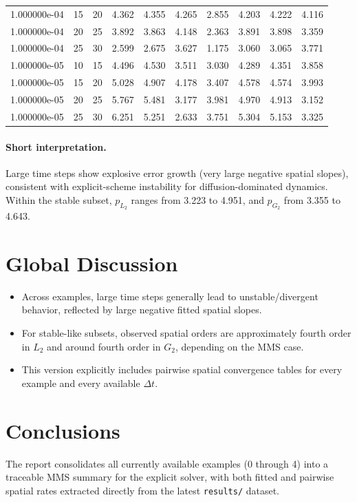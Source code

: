 \documentclass[11pt,a4paper]{article}
\begin{document}
\begin{table}[htbp]
{\begin{tabular}{cccccccccc}
1.000000e-04 & 15 & 20 & 4.362 & 4.355 & 4.265 & 2.855 & 4.203 & 4.222 & 4.116 \\
1.000000e-04 & 20 & 25 & 3.892 & 3.863 & 4.148 & 2.363 & 3.891 & 3.898 & 3.359 \\
1.000000e-04 & 25 & 30 & 2.599 & 2.675 & 3.627 & 1.175 & 3.060 & 3.065 & 3.771 \\
1.000000e-05 & 10 & 15 & 4.496 & 4.530 & 3.511 & 3.030 & 4.289 & 4.351 & 3.858 \\
1.000000e-05 & 15 & 20 & 5.028 & 4.907 & 4.178 & 3.407 & 4.578 & 4.574 & 3.993 \\
1.000000e-05 & 20 & 25 & 5.767 & 5.481 & 3.177 & 3.981 & 4.970 & 4.913 & 3.152 \\
1.000000e-05 & 25 & 30 & 6.251 & 5.251 & 2.633 & 3.751 & 5.304 & 5.153 & 3.325 \\
\bottomrule
\end{tabular}%
}
\end{table}
\paragraph{Short interpretation.}
Large time steps show explosive error growth (very large negative spatial slopes), consistent with explicit-scheme instability for diffusion-dominated dynamics. Within the stable subset, $p_{L_2}$ ranges from 3.223 to 4.951, and $p_{G_2}$ from 3.355 to 4.643.
\section{Global Discussion}
\begin{itemize}
\item Across examples, large time steps generally lead to unstable/divergent behavior, reflected by large negative fitted spatial slopes.
\item For stable-like subsets, observed spatial orders are approximately fourth order in $L_2$ and around fourth order in $G_2$, depending on the MMS case.
\item This version explicitly includes pairwise spatial convergence tables for every example and every available $\Delta t$.
\end{itemize}
\section{Conclusions}
The report consolidates all currently available examples (0 through 4) into a traceable MMS summary for the explicit solver, with both fitted and pairwise spatial rates extracted directly from the latest \texttt{results/} dataset.
\end{document}
